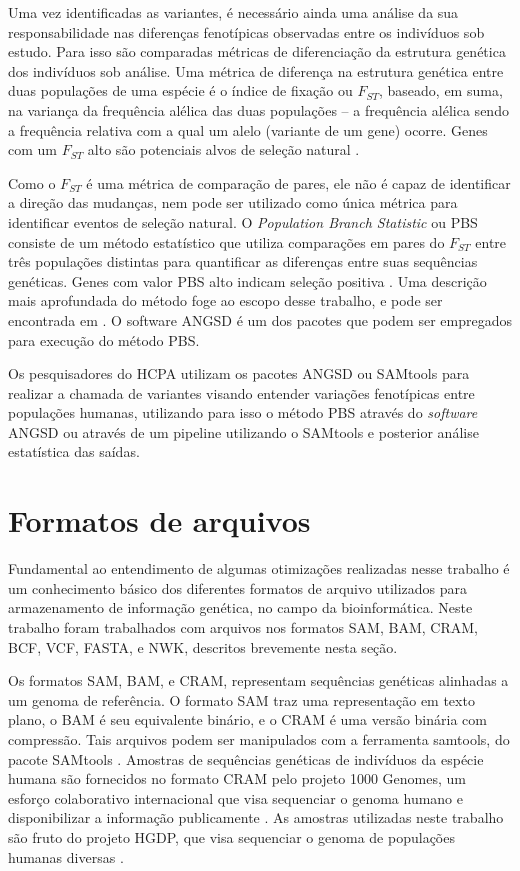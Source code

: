 \documentclass[cic,tc]{iiufrgs}
\begin{document}
Uma vez identificadas as variantes, é necessário ainda uma análise da sua
responsabilidade nas diferenças fenotípicas observadas entre os indivíduos sob
estudo. Para isso são comparadas métricas de diferenciação da estrutura
genética dos indivíduos sob análise. Uma métrica de diferença na estrutura
genética entre duas populações de uma espécie é o índice de fixação ou
$F_{ST}$, baseado, em suma, na variança da frequência alélica das duas
populações -- a frequência alélica sendo a frequência relativa com a qual um
alelo (variante de um gene) ocorre. Genes com um $F_{ST}$ alto são potenciais
alvos de seleção natural \cite{yi2010sequencing}.

Como o $F_{ST}$ é uma métrica de comparação de pares, ele não é capaz de
identificar a direção das mudanças, nem pode ser utilizado como única métrica
para identificar eventos de seleção natural. O \textit{Population Branch
Statistic} ou PBS consiste de um método estatístico que utiliza comparações em
pares do $F_{ST}$ entre três populações distintas para quantificar as
diferenças entre suas sequências genéticas. Genes com valor PBS alto indicam
seleção positiva \cite{jiang2019population}. Uma descrição mais aprofundada do
método foge ao escopo desse trabalho, e pode ser encontrada em
\cite{yi2010sequencing}. O software ANGSD é um dos pacotes que podem ser
empregados para execução do método PBS.

Os pesquisadores do HCPA utilizam os pacotes ANGSD ou SAMtools para realizar a
chamada de variantes visando entender variações fenotípicas entre populações
humanas, utilizando para isso o método PBS através do \textit{software} ANGSD ou através
de um pipeline utilizando o SAMtools e posterior análise estatística das
saídas.

\section{Formatos de arquivos}
\label{sec:formats}


Fundamental ao entendimento de algumas otimizações realizadas nesse trabalho é
um conhecimento básico dos diferentes formatos de arquivo utilizados para
armazenamento de informação genética, no campo da bioinformática. Neste
trabalho foram trabalhados com arquivos nos formatos SAM, BAM, CRAM, BCF, VCF,
FASTA, e NWK, descritos brevemente nesta seção.

Os formatos SAM, BAM, e CRAM, representam sequências genéticas alinhadas a um
genoma de referência. O formato SAM traz uma representação em texto plano, o
BAM é seu equivalente binário, e o CRAM é uma versão binária com compressão.
Tais arquivos podem ser manipulados com a ferramenta samtools, do pacote
SAMtools \cite{danecek2021twelve}. Amostras de sequências genéticas de
indivíduos da espécie humana são fornecidos no formato CRAM pelo projeto 1000
Genomes, um esforço colaborativo internacional que visa sequenciar o genoma
humano e disponibilizar a informação publicamente \cite{via20101000}. As
amostras utilizadas neste trabalho são fruto do projeto HGDP, que visa
sequenciar o genoma de populações humanas diversas \cite{cavalli2005human}.
\end{document}
